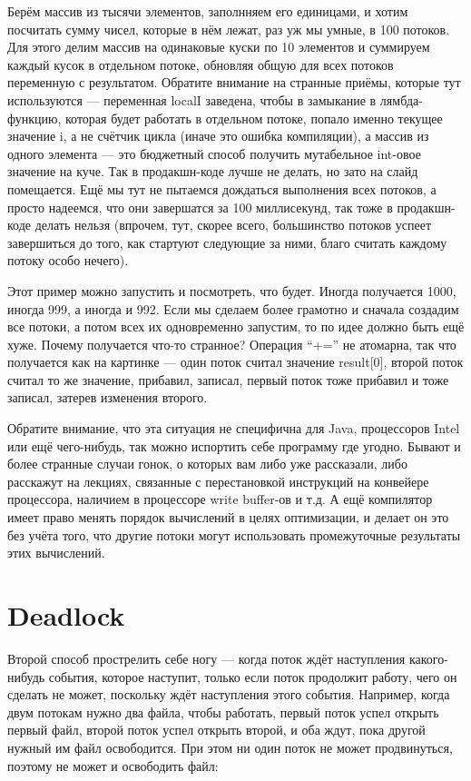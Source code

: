 \documentclass[a5paper]{article}
\begin{document}
Берём массив из тысячи элементов, заполнняем его единицами, и хотим посчитать сумму чисел, которые в нём лежат, раз уж мы умные, в 100 потоков. Для этого делим массив на одинаковые куски по 10 элементов и суммируем каждый кусок в отдельном потоке, обновляя общую для всех потоков переменную с результатом. Обратите внимание на странные приёмы, которые тут используются --- переменная localI заведена, чтобы в замыкание в лямбда-функцию, которая будет работать в отдельном потоке, попало именно текущее значение i, а не счётчик цикла (иначе это ошибка компиляции), а массив из одного элемента --- это бюджетный способ получить мутабельное int-овое значение на куче. Так в продакшн-коде лучше не делать, но зато на слайд помещается. Ещё мы тут не пытаемся дождаться выполнения всех потоков, а просто надеемся, что они завершатся за 100 миллисекунд, так тоже в продакшн-коде делать нельзя (впрочем, тут, скорее всего, большинство потоков успеет завершиться до того, как стартуют следующие за ними, благо считать каждому потоку особо нечего). 

Этот пример можно запустить и посмотреть, что будет. Иногда получается 1000, иногда 999, а иногда и 992. Если мы сделаем более грамотно и сначала создадим все потоки, а потом всех их одновременно запустим, то по идее должно быть ещё хуже. Почему получается что-то странное? Операция ``+='' не атомарна, так что получается как на картинке --- один поток считал значение result[0], второй поток считал то же значение, прибавил, записал, первый поток тоже прибавил и тоже записал, затерев изменения второго.

Обратите внимание, что эта ситуация не специфична для Java, процессоров Intel или ещё чего-нибудь, так можно испортить себе программу где угодно. Бывают и более странные случаи гонок, о которых вам либо уже рассказали, либо расскажут на лекциях, связанные с перестановкой инструкций на конвейере процессора, наличием в процессоре write buffer-ов и т.д. А ещё компилятор имеет право менять порядок вычислений в целях оптимизации, и делает он это без учёта того, что другие потоки могут использовать промежуточные результаты этих вычислений.

\section{Deadlock}

Второй способ прострелить себе ногу --- когда поток ждёт наступления какого-нибудь события, которое наступит, только если поток продолжит работу, чего он сделать не может, поскольку ждёт наступления этого события. Например, когда двум потокам нужно два файла, чтобы работать, первый поток успел открыть первый файл, второй поток успел открыть второй, и оба ждут, пока другой нужный им файл освободится. При этом ни один поток не может продвинуться, поэтому не может и освободить файл:
\end{document}
